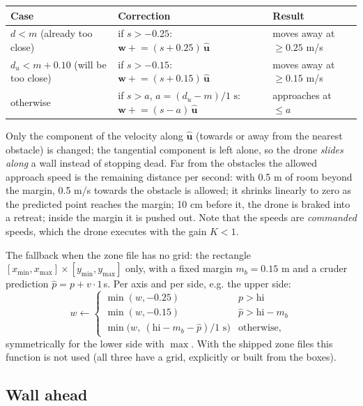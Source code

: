 \begin{center}\footnotesize
\begin{tabular}{lll}
\toprule
\textbf{Case} & \textbf{Correction} & \textbf{Result} \\
\midrule
$d < m$ (already too close) & if $s>-0.25$: $\bm w \mathrel{+}= (s+0.25)\,\hat{\bm u}$ & moves away at $\ge0.25$ m/s \\
$d_u < m+0.10$ (will be too close) & if $s>-0.15$: $\bm w \mathrel{+}= (s+0.15)\,\hat{\bm u}$ & moves away at $\ge0.15$ m/s \\
otherwise & if $s>a$, $a=(d_u-m)/1\text{ s}$: $\bm w \mathrel{+}= (s-a)\,\hat{\bm u}$ & approaches at $\le a$ \\
\bottomrule
\end{tabular}
\end{center}

\begin{intuition}
Only the component of the velocity along $\hat{\bm u}$ (towards or away from the nearest obstacle) is changed; the
tangential component is left alone, so the drone \emph{slides along} a wall instead of stopping dead. Far from the
obstacles the allowed approach speed is the remaining distance per second: with 0.5 m of room beyond the margin,
0.5 m/s towards the obstacle is allowed; it shrinks linearly to zero as the predicted point reaches the margin;
10 cm before it, the drone is braked into a retreat; inside the margin it is pushed out. Note that the speeds are
\emph{commanded} speeds, which the drone executes with the gain $K<1$.
\end{intuition}

The fallback when the zone file has no grid: the rectangle $[x_{\min},x_{\max}]\times[y_{\min},y_{\max}]$ only,
with a fixed margin $m_b=0.15$ m and a cruder prediction $\hat p = p + v\cdot 1\,$s. Per axis and per side, e.g.
the upper side:
$$
w \leftarrow
\begin{cases}
\min(w,-0.25) & p > \text{hi}\\
\min(w,-0.15) & \hat p > \text{hi}-m_b\\
\min\big(w,\ (\text{hi}-m_b-\hat p)/1\text{ s}\big) & \text{otherwise,}
\end{cases}
$$
symmetrically for the lower side with $\max$. With the shipped zone files this function is not used (all three
have a grid, explicitly or built from the boxes).

\subsection{Wall ahead}

